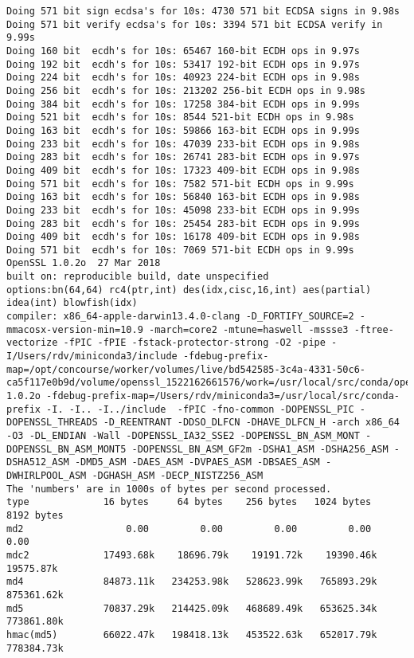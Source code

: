 \documentclass[%
 aip,
 jmp,%
 amsmath,amssymb,
 reprint,%
]{revtex4-1}
\begin{document}
\begin{verbatim}
Doing 571 bit sign ecdsa's for 10s: 4730 571 bit ECDSA signs in 9.98s 
Doing 571 bit verify ecdsa's for 10s: 3394 571 bit ECDSA verify in 9.99s
Doing 160 bit  ecdh's for 10s: 65467 160-bit ECDH ops in 9.97s
Doing 192 bit  ecdh's for 10s: 53417 192-bit ECDH ops in 9.97s
Doing 224 bit  ecdh's for 10s: 40923 224-bit ECDH ops in 9.98s
Doing 256 bit  ecdh's for 10s: 213202 256-bit ECDH ops in 9.98s
Doing 384 bit  ecdh's for 10s: 17258 384-bit ECDH ops in 9.99s
Doing 521 bit  ecdh's for 10s: 8544 521-bit ECDH ops in 9.98s
Doing 163 bit  ecdh's for 10s: 59866 163-bit ECDH ops in 9.99s
Doing 233 bit  ecdh's for 10s: 47039 233-bit ECDH ops in 9.98s
Doing 283 bit  ecdh's for 10s: 26741 283-bit ECDH ops in 9.97s
Doing 409 bit  ecdh's for 10s: 17323 409-bit ECDH ops in 9.98s
Doing 571 bit  ecdh's for 10s: 7582 571-bit ECDH ops in 9.99s
Doing 163 bit  ecdh's for 10s: 56840 163-bit ECDH ops in 9.98s
Doing 233 bit  ecdh's for 10s: 45098 233-bit ECDH ops in 9.99s
Doing 283 bit  ecdh's for 10s: 25454 283-bit ECDH ops in 9.99s
Doing 409 bit  ecdh's for 10s: 16178 409-bit ECDH ops in 9.98s
Doing 571 bit  ecdh's for 10s: 7069 571-bit ECDH ops in 9.99s
OpenSSL 1.0.2o  27 Mar 2018
built on: reproducible build, date unspecified
options:bn(64,64) rc4(ptr,int) des(idx,cisc,16,int) aes(partial) idea(int) blowfish(idx) 
compiler: x86_64-apple-darwin13.4.0-clang -D_FORTIFY_SOURCE=2 -mmacosx-version-min=10.9 -march=core2 -mtune=haswell -mssse3 -ftree-vectorize -fPIC -fPIE -fstack-protector-strong -O2 -pipe -I/Users/rdv/miniconda3/include -fdebug-prefix-map=/opt/concourse/worker/volumes/live/bd542585-3c4a-4331-50c6-ca5f117e0b9d/volume/openssl_1522162661576/work=/usr/local/src/conda/openssl-1.0.2o -fdebug-prefix-map=/Users/rdv/miniconda3=/usr/local/src/conda-prefix -I. -I.. -I../include  -fPIC -fno-common -DOPENSSL_PIC -DOPENSSL_THREADS -D_REENTRANT -DDSO_DLFCN -DHAVE_DLFCN_H -arch x86_64 -O3 -DL_ENDIAN -Wall -DOPENSSL_IA32_SSE2 -DOPENSSL_BN_ASM_MONT -DOPENSSL_BN_ASM_MONT5 -DOPENSSL_BN_ASM_GF2m -DSHA1_ASM -DSHA256_ASM -DSHA512_ASM -DMD5_ASM -DAES_ASM -DVPAES_ASM -DBSAES_ASM -DWHIRLPOOL_ASM -DGHASH_ASM -DECP_NISTZ256_ASM
The 'numbers' are in 1000s of bytes per second processed.
type             16 bytes     64 bytes    256 bytes   1024 bytes   8192 bytes
md2                  0.00         0.00         0.00         0.00         0.00 
mdc2             17493.68k    18696.79k    19191.72k    19390.46k    19575.87k
md4              84873.11k   234253.98k   528623.99k   765893.29k   875361.62k
md5              70837.29k   214425.09k   468689.49k   653625.34k   773861.80k
hmac(md5)        66022.47k   198418.13k   453522.63k   652017.79k   778384.73k

\end{verbatim}
\end{document}
